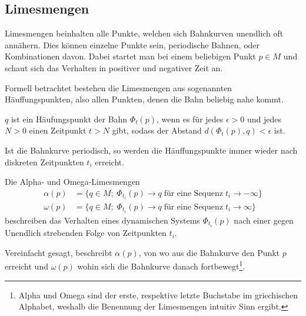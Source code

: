 \subsection{Limesmengen} \label{poinbendix:subsection:limesmengen}

Limesmengen beinhalten alle Punkte, welchen sich Bahnkurven unendlich oft annähern.
%
Dies können einzelne Punkte sein, periodische Bahnen, oder Kombinationen davon.
Dabei startet man bei einem beliebigen Punkt $p \in M$ und schaut sich das Verhalten in positiver und negativer Zeit an.

Formell betrachtet bestehen die Limesmengen aus sogenannten Häuffungspunkten, also allen Punkten, denen die Bahn beliebig nahe kommt.
\begin{definition}[Häuffungspunkte]
%
\label{poinbendix:def:limesmengen}
$q$ ist ein Häufungspunkt der Bahn $\Phi_t(p)$, wenn es für jedes $\epsilon > 0$ und jedes $N > 0$ einen Zeitpunkt $t > N$ gibt, sodass der Abstand $d(\Phi_t(p),q) < \epsilon$ ist.
\end{definition}

Ist die Bahnkurve periodisch, so werden die Häuffungspunkte immer wieder nach diskreten Zeitpunkten $t_i$ erreicht.
\begin{definition}[Limesmengen]
\label{poinbendix:def:limesmengen}
%
Die Alpha- und Omega-Limesmengen
%
%
\begin{align*}
    \alpha(p) &= \{q\in M; \; \Phi_{t_i}(p) \to q \; \text{für eine Sequenz} \; t_i \to -\infty\} \\
    \omega(p) &= \{q\in M; \; \Phi_{t_i}(p) \to q \; \text{für eine Sequenz} \; t_i \to \infty\}
\end{align*}
beschreiben das Verhalten eines dynamischen Systems $\Phi_{t_i}(p)$ nach einer gegen Unendlich strebenden Folge von Zeitpunkten $t_i$.
\end{definition}

Vereinfacht gesagt, beschreibt $\alpha(p)$, von wo aus die Bahnkurve den Punkt $p$ erreicht und $\omega(p)$ wohin sich die Bahnkurve danach fortbewegt\footnote{Alpha und Omega sind der erste, respektive letzte Buchstabe im griechischen Alphabet, weshalb die Benennung der Limesmengen intuitiv Sinn ergibt.}.

